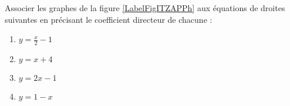 
\begin{exercice}\label{exosmath-0395}

    Associer les graphes de la figure \ref{LabelFigITZAPPh} aux équations de droites suivantes en précisant le coefficient directeur de chacune :
    \begin{multicols}{2}
        \begin{enumerate}
            \item
                \( y=\frac{ x }{ 2 }-1\)
            \item
                \( y=x+4\)
            \item
                \( y=2x-1\)
            \item
                \( y=1-x\)
        \end{enumerate}
    \end{multicols}
\newcommand{\CaptionFigITZAPPh}{Les graphes de l'exercice \ref{exosmath-0395}.}


\end{exercice}
